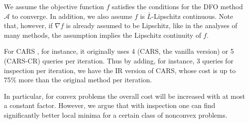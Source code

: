 \documentclass[sn-mathphys,Numbered]{sn-jnl}
\theoremstyle{thmstyleone}
\theoremstyle{thmstyletwo}
\theoremstyle{thmstylethree}
\begin{document}
We assume the objective function $f$ satisfies the conditions for the DFO method $\mathcal{A}$ to converge. In addition, we also assume $f$ is $\bar{L}$-Lipschitz continuous. Note that, however, if $\nabla f$ is already assumed to be Lipschitz, like in the analyses of many methods, the assumption implies the Lipschitz continuity of $f$.





For CARS \cite{kim2021curvature}, for instance, it originally uses 4 (CARS, the vanilla version) or 5 (CARS-CR) queries per iteration. Thus by adding, for instance, 3 queries for inspection per iteration, we have the IR version of CARS, whose cost is up to 75\% more than the original method per iteration.

In particular, for convex problems the overall cost will be increased with at most a constant factor. However, we argue that with inspection one can find significantly better local minima for a certain class of nonconvex problems.
\end{document}
